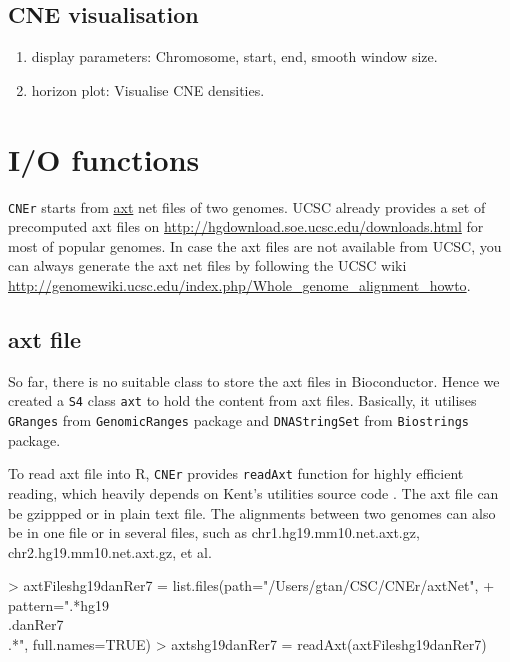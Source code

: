 \documentclass{article}
\newcommand{\Rcode}[1]{{\texttt{#1}}}
\begin{document}
\subsection{CNE visualisation}
\begin{enumerate}
  \item display parameters: Chromosome, start, end, smooth window size.
  \item horizon plot: Visualise CNE densities.
\end{enumerate}

\section{I/O functions}
\Rcode{CNEr} starts from \href{http://genome.ucsc.edu/goldenPath/help/axt.html}{axt}
net files of two genomes.
UCSC already provides a set of precomputed axt files on 
\url{http://hgdownload.soe.ucsc.edu/downloads.html}
for most of popular genomes.
In case the axt files are not available from UCSC, 
you can always generate the axt net files by following the UCSC wiki
\url{http://genomewiki.ucsc.edu/index.php/Whole_genome_alignment_howto}.

\subsection{axt file}
So far, there is no suitable class to store the axt files in Bioconductor.
Hence we created a \Rcode{S4} class \Rcode{axt} to hold the content from axt files.
Basically, it utilises \Rcode{GRanges} from \Rcode{GenomicRanges} package
and \Rcode{DNAStringSet} from \Rcode{Biostrings} package.

To read axt file into R, 
\Rcode{CNEr} provides \Rcode{readAxt} function
for highly efficient reading, 
which heavily depends on Kent's utilities source code \citep{Kent:2002bw}.
The axt file can be gzippped or in plain text file.
The alignments between two genomes can also be in one file or in several files, 
such as chr1.hg19.mm10.net.axt.gz, chr2.hg19.mm10.net.axt.gz, et al.

\begin{Schunk}
\begin{Sinput}
> axtFileshg19danRer7 = list.files(path="/Users/gtan/CSC/CNEr/axtNet",
+                                  pattern=".*hg19\\.danRer7\\.*", full.names=TRUE)
> axtshg19danRer7 = readAxt(axtFileshg19danRer7)
\end{Sinput}
\end{Schunk}
\end{document}
